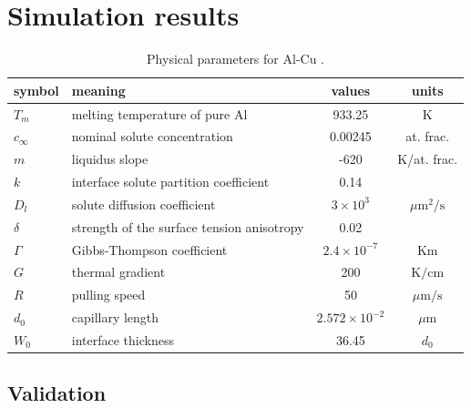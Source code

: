 \documentclass[final,times]{elsarticle}
\numberwithin{equation}{section}
\begin{document}
\section{Simulation results}

\begin{table}
\centering
\caption{Physical parameters for Al-Cu \cite{Takaki2014}.}
\begin{tabular}{l l c c }
\toprule
symbol & meaning & values & units \\
\midrule
$T_m$ & melting temperature of pure Al & 933.25  & K \\
$c_{\infty}$ & nominal solute concentration &  0.00245 & at. frac. \\
$m$ &liquidus slope &  -620 & K/at. frac. \\
$k$ & interface solute partition coefficient & 0.14 &\\
$D_l$ & solute diffusion coefficient &  $3\times 10^{3}$  & ${\mu\text{m}}^2/\text{s}$ \\
$\delta$ & strength of the surface tension anisotropy  &  0.02  &\\
$\Gamma$ & Gibbs-Thompson coefficient & $2.4\times 10^{-7}$ & Km \\
$G$ & thermal gradient & 200 & $\text{K} / \text{cm}$ \\
$R$ & pulling speed &  50 & $\mu \text{m} / \text{s}$ \\
$d_0$ & capillary length & $ 2.572\times10^{-2}$  & $\mu$m \\
$W_0$ & interface thickness  & 36.45 & $d_0$ \\
\bottomrule
\end{tabular}\label{tab:Takaki}

\end{table}

\subsection{Validation}
\end{document}
